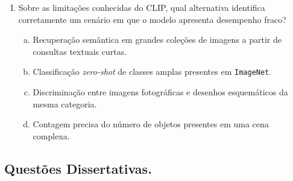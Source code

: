 \documentclass{dlproblemset}
\begin{document}
\begin{enumerate}[I)]
    \item Sobre as limitações conhecidas do CLIP, qual alternativa identifica corretamente um cenário em que o modelo apresenta desempenho fraco?
    \begin{enumerate}[(a)]
        \item Recuperação semântica em grandes coleções de imagens a partir de consultas textuais curtas.
        \item Classificação \textit{zero-shot} de classes amplas presentes em \texttt{ImageNet}.
        \item Discriminação entre imagens fotográficas e desenhos esquemáticos da mesma categoria.
        \item Contagem precisa do número de objetos presentes em uma cena complexa.
    \end{enumerate}

\end{enumerate}

\subsection*{Questões Dissertativas.}
\end{document}
